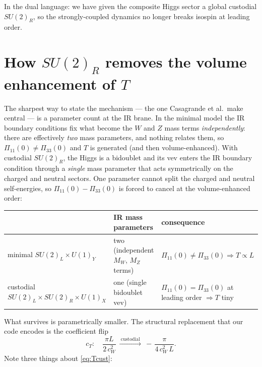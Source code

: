 \documentclass[11pt]{article}
\newcommand{\cwsq}{c_W^2}
\newcommand{\Pibig}{\Pi}
\newcommand{\SUL}{SU(2)_L}
\newcommand{\SUR}{SU(2)_R}
\newcommand{\UX}{U(1)_X}
\theoremstyle{definition}
\begin{document}
In the dual language: we have given the composite Higgs sector a global custodial
$\SUR$, so the strongly-coupled dynamics no longer breaks isospin at leading
order.

\section{How $\SUR$ removes the volume enhancement of $T$}
\label{sec:Tcure}

The sharpest way to state the mechanism --- the one Casagrande et al.\ make
central --- is a parameter count at the IR brane. In the minimal model the IR
boundary conditions fix what become the $W$ and $Z$ mass terms
\emph{independently}: there are effectively \emph{two} mass parameters, and
nothing relates them, so $\Pibig_{11}(0)\neq\Pibig_{33}(0)$ and $T$ is generated
(and then volume-enhanced). With custodial $\SUR$, the Higgs is a bidoublet and
its vev enters the IR boundary condition through a \emph{single} mass parameter
that acts symmetrically on the charged and neutral sectors. One parameter cannot
split the charged and neutral self-energies, so $\Pibig_{11}(0)-\Pibig_{33}(0)$
is forced to cancel at the volume-enhanced order:
\begin{center}
\begin{tabular}{lll}
\toprule
 & IR mass parameters & consequence \\
\midrule
minimal $\SUL\times U(1)_Y$ & two (independent $M_W$, $M_Z$ terms) & $\Pibig_{11}(0)\neq\Pibig_{33}(0)\Rightarrow T\propto L$ \\
custodial $\SUL\times\SUR\times\UX$ & one (single bidoublet vev) & $\Pibig_{11}(0)=\Pibig_{33}(0)$ at leading order $\Rightarrow T$ tiny \\
\bottomrule
\end{tabular}
\end{center}
What survives is parametrically smaller. The structural
replacement that our code encodes is the coefficient flip
\begin{equation}
\boxed{\;c_T:\quad \frac{\pi L}{2\,\cwsq}\ \xrightarrow{\ \text{custodial}\ }\
-\,\frac{\pi}{4\,\cwsq\,L}.\;}
\label{eq:Tcust}
\end{equation}
Note three things about \eqref{eq:Tcust}:
\end{document}
